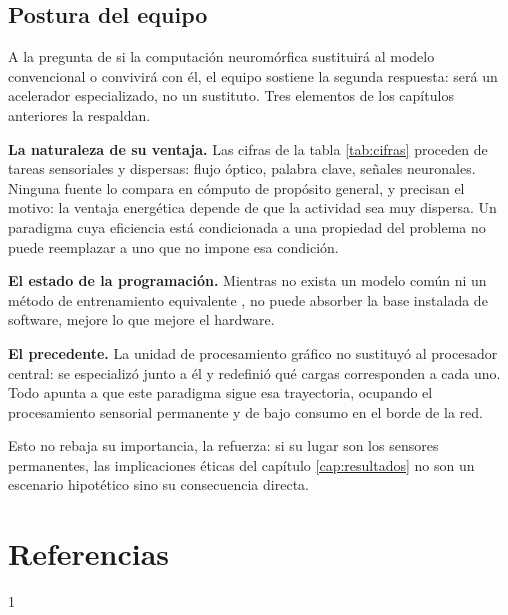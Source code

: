 \documentclass[a4paper,11pt,oneside]{book}
\begin{document}
\section*{Postura del equipo}

A la pregunta de si la computación neuromórfica sustituirá al modelo
convencional o convivirá con él, el equipo sostiene la segunda respuesta: será
un acelerador especializado, no un sustituto. Tres elementos de los capítulos
anteriores la respaldan.

\textbf{La naturaleza de su ventaja.} Las cifras de la tabla \ref{tab:cifras}
proceden de tareas sensoriales y dispersas: flujo óptico, palabra clave, señales
neuronales. Ninguna fuente lo compara en cómputo de propósito general, y
\textcite{yan2024} precisan el motivo: la ventaja energética depende de que la
actividad sea muy dispersa. Un paradigma cuya eficiencia está condicionada a una
propiedad del problema no puede reemplazar a uno que no impone esa condición.

\textbf{El estado de la programación.} Mientras no exista un modelo común ni un
método de entrenamiento equivalente \parencite{schuman2022, roy2019}, no puede
absorber la base instalada de software, mejore lo que mejore el hardware.

\textbf{El precedente.} La unidad de procesamiento gráfico no sustituyó al
procesador central: se especializó junto a él y redefinió qué cargas corresponden
a cada uno. Todo apunta a que este paradigma sigue esa trayectoria, ocupando el
procesamiento sensorial permanente y de bajo consumo en el borde de la red.

Esto no rebaja su importancia, la refuerza: si su lugar son los sensores
permanentes, las implicaciones éticas del capítulo \ref{cap:resultados} no son un
escenario hipotético sino su consecuencia directa.

    \clearpage
    \chapter*{Referencias}
    \renewcommand*{\bibfont}{\footnotesize}
    \begin{spacing}{1}
        \setlength{\bibitemsep}{0pt plus 0pt minus 0pt}
        \setcounter{biburlnumpenalty}{9000}
        \setcounter{biburlucpenalty}{9000}
        \setcounter{biburllcpenalty}{9000}
        \printbibliography[heading=none]
    \end{spacing}
\end{document}
